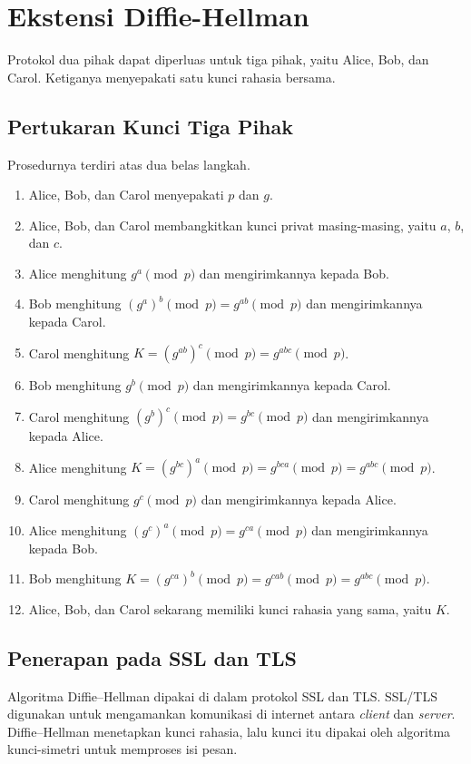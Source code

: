 \section{Ekstensi Diffie-Hellman}
\label{sec:ekstensi-dh}


Protokol dua pihak dapat diperluas untuk tiga pihak, yaitu Alice, Bob, dan
Carol. Ketiganya menyepakati satu kunci rahasia bersama.

\subsection{Pertukaran Kunci Tiga Pihak}

Prosedurnya terdiri atas dua belas langkah.
\begin{enumerate}
    \item Alice, Bob, dan Carol menyepakati $p$ dan $g$.
    \item Alice, Bob, dan Carol membangkitkan kunci privat masing-masing, yaitu
          $a$, $b$, dan $c$.
    \item Alice menghitung $g^a \pmod p$ dan mengirimkannya kepada Bob.
    \item Bob menghitung $(g^a)^b \pmod p = g^{ab} \pmod p$ dan mengirimkannya
          kepada Carol.
    \item Carol menghitung $K = (g^{ab})^c \pmod p = g^{abc} \pmod p$.
    \item Bob menghitung $g^b \pmod p$ dan mengirimkannya kepada Carol.
    \item Carol menghitung $(g^b)^c \pmod p = g^{bc} \pmod p$ dan
          mengirimkannya kepada Alice.
    \item Alice menghitung $K = (g^{bc})^a \pmod p = g^{bca} \pmod p
          = g^{abc} \pmod p$.
    \item Carol menghitung $g^c \pmod p$ dan mengirimkannya kepada Alice.
    \item Alice menghitung $(g^c)^a \pmod p = g^{ca} \pmod p$ dan
          mengirimkannya kepada Bob.
    \item Bob menghitung $K = (g^{ca})^b \pmod p = g^{cab} \pmod p
          = g^{abc} \pmod p$.
    \item Alice, Bob, dan Carol sekarang memiliki kunci rahasia yang sama,
          yaitu $K$.
\end{enumerate}

\subsection{Penerapan pada SSL dan TLS}

Algoritma Diffie--Hellman dipakai di dalam protokol SSL dan TLS. SSL/TLS
digunakan untuk mengamankan komunikasi di internet antara \textit{client} dan
\textit{server}. Diffie--Hellman menetapkan kunci rahasia, lalu kunci itu dipakai
oleh algoritma kunci-simetri untuk memproses isi pesan.
